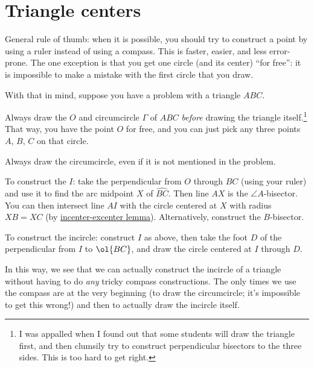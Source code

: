 \documentclass[11pt]{scrartcl}
\begin{document}
\section{Triangle centers}
General rule of thumb: when it is possible,
you should try to construct a point by using a ruler
instead of using a compass.
This is faster, easier, and less error-prone.
The one exception is that you get one circle (and its center) ``for free'':
it is impossible to make a mistake with the first circle that you draw.

With that in mind, suppose you have a problem with a triangle $ABC$.
\begin{itemize}
  \ii Always draw the  $O$ and circumcircle $\Gamma$ of $ABC$
  \emph{before} drawing the triangle itself.\footnote{I
    was appalled when I found out that some students will
    draw the triangle first, and then clumsily try to construct
      perpendicular bisectors to the three sides.
  This is too hard to get right.}
  That way, you have the point $O$ for free,
  and you can just pick any three points $A$, $B$, $C$ on that circle.

  \ii Always draw the circumcircle, even if it is not mentioned in the problem.

  \ii To construct the  $I$:
  take the perpendicular from $O$ through $BC$
  (using your ruler) and use it to find the
  arc midpoint $X$ of $\widehat{BC}$.
  Then line $AX$ is the $\angle A$-bisector.
  You can then intersect line $AI$ with the circle centered at $X$ with radius $XB=XC$
  (by \href{https://w.wiki/AEpo}{incenter-excenter lemma}).
  Alternatively, construct the $B$-bisector.

  \ii To construct the incircle: construct $I$ as above,
  then take the foot $D$ of the perpendicular from $I$ to $\ol{BC}$,
  and draw the circle centered at $I$ through $D$.
\end{itemize}

In this way, we see that we can actually construct the incircle of a triangle
without having to do \emph{any} tricky compass constructions.
The only times we use the compass are at the very beginning
(to draw the circumcircle; it's impossible to get this wrong!)
and then to actually draw the incircle itself.
\end{document}

